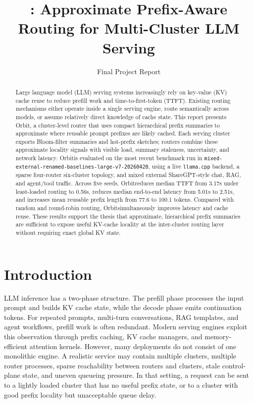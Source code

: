 \documentclass[10pt,twocolumn]{article}
\title{\sys: Approximate Prefix-Aware Routing for Multi-Cluster LLM Serving}
\author{Final Project Report}
\date{}
\newcommand{\sys}{Orbit}
\newcommand{\runpath}{\texttt{mixed-\allowbreak{}external-\allowbreak{}renamed-\allowbreak{}baselines-\allowbreak{}large-v7-\allowbreak{}20260420}}
\begin{document}
\maketitle

\begin{abstract}
Large language model (LLM) serving systems increasingly rely on key-value (KV) cache reuse to reduce prefill work and time-to-first-token (TTFT). Existing routing mechanisms either operate inside a single serving engine, route semantically across models, or assume relatively direct knowledge of cache state. This report presents \sys, a cluster-level router that uses compact hierarchical prefix summaries to approximate where reusable prompt prefixes are likely cached. Each serving cluster exports Bloom-filter summaries and hot-prefix sketches; routers combine these approximate locality signals with visible load, summary staleness, uncertainty, and network latency. \sys is evaluated on the most recent benchmark run in \runpath, using a live \texttt{llama.cpp} backend, a sparse four-router six-cluster topology, and mixed external ShareGPT-style chat, RAG, and agent/tool traffic. Across five seeds, \sys reduces median TTFT from 3.17s under least-loaded routing to 0.56s, reduces median end-to-end latency from 5.01s to 2.51s, and increases mean reusable prefix length from 77.6 to 100.1 tokens. Compared with random and round-robin routing, \sys simultaneously improves latency and cache reuse. These results support the thesis that approximate, hierarchical prefix summaries are sufficient to expose useful KV-cache locality at the inter-cluster routing layer without requiring exact global KV state.
\end{abstract}

\section{Introduction}

LLM inference has a two-phase structure. The prefill phase processes the input prompt and builds KV cache state, while the decode phase emits continuation tokens. For repeated prompts, multi-turn conversations, RAG templates, and agent workflows, prefill work is often redundant. Modern serving engines exploit this observation through prefix caching, KV cache managers, and memory-efficient attention kernels. However, many deployments do not consist of one monolithic engine. A realistic service may contain multiple clusters, multiple router processes, sparse reachability between routers and clusters, stale control-plane state, and uneven queueing pressure. In that setting, a request can be sent to a lightly loaded cluster that has no useful prefix state, or to a cluster with good prefix locality but unacceptable queue delay.
\end{document}
